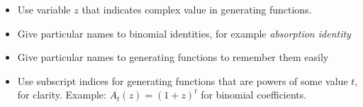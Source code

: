 ﻿\begin{itemize}
    \item Use variable $z$ that indicates complex value in generating functions.
    \item Give particular names to binomial identities, for example \textit{absorption identity}
    \item Give particular names to generating functions to remember them easily
    \item Use subscript indices for generating functions that are powers of some value $t$, for clarity.
    Example: $A_t(z) = (1+z)^t$ for binomial coefficients.
\end{itemize}

